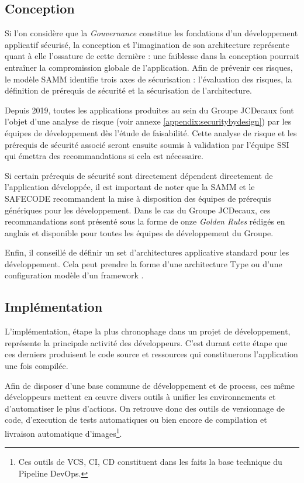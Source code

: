 \subsection{Conception}

Si l'on considère que la \emph{Gouvernance} constitue les fondations d'un développement applicatif sécurisé, la 
conception et l'imagination de son architecture représente quant à elle l'ossature de cette dernière : une faiblesse dans 
la conception pourrait entraîner la compromission globale de l'application. 
\newline Afin de prévenir ces risques, le modèle \ac{SAMM} identifie trois axes de sécurisation : l'évaluation des risques, 
la définition de prérequis de sécurité et la sécurisation de l'architecture.

Depuis 2019, toutes les applications produites au sein du Groupe JCDecaux font l'objet d'une analyse de risque 
(voir annexe \ref{appendix:securitybydesign}) par les équipes de développement dès l'étude de faisabilité. 
Cette analyse de risque et les prérequis de sécurité associé seront ensuite soumis à validation par l'équipe \ac{SSI} 
qui émettra des recommandations si cela est nécessaire.

Si certain prérequis de sécurité sont directement dépendent directement de l'application développée, il est important 
de noter que la \ac{SAMM} et le \ac{SAFECODE}\autocite[p. 15]{fundamental_pract_sec_soft_safecode_2018} recommandent la 
mise à disposition des équipes de prérequis génériques pour les développement.
\newline Dans le cas du Groupe JCDecaux, ces recommandations sont présenté sous la forme de onze \emph{Golden Rules}
rédigés en anglais et disponible pour toutes les équipes de développement du Groupe.

Enfin, il conseillé de définir un set d'architectures applicative standard pour les développement. Cela peut prendre la 
forme d'une architecture Type ou d'une configuration modèle d'un framework .

\subsection{Implémentation}
L'implémentation, étape la plus chronophage dans un projet de développement, représente la principale activité des 
développeurs. C'est durant cette étape que ces derniers produisent le code source et ressources qui constituerons 
l'application une fois compilée.

Afin de disposer d'une base commune de développement et de process, ces même développeurs mettent en œuvre divers outils
à unifier les environnements et d'automatiser le plus d'actions. On retrouve donc des outils de versionnage de code, 
d'execution de tests automatiques ou bien encore de compilation et livraison automatique d'images\footnote{Ces outils de \ac{VCS}, 
\ac{CI}, \ac{CD} constituent dans les faits la base technique du Pipeline DevOps.}.

